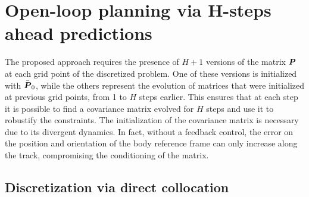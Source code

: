 \section{Open-loop planning via H-steps ahead predictions}
\label{sec:open_loop_planning}
The proposed approach requires the presence of $H+1$ versions of the matrix $\boldsymbol{P}$ at each grid point of the discretized problem. One of these versions is initialized with $\bar{\boldsymbol{P}}_0$, while the others represent the evolution of matrices that were initialized at previous grid points, from 1 to $H$ steps earlier. This ensures that at each step it is possible to find a covariance matrix evolved for $H$ steps and use it to robustify the constraints. The initialization of the covariance matrix is necessary due to its divergent dynamics. In fact, without a feedback control, the error on the position and orientation of the body reference frame can only increase along the track, compromising the conditioning of the matrix. 

\subsection{Discretization via direct collocation}
\label{sec:discretization}

